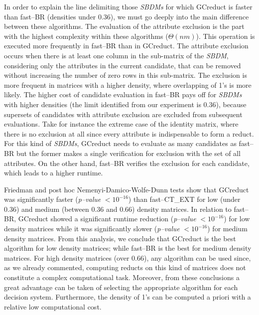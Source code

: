 \documentclass[number,preprint,review,12pt]{elsarticle}
\begin{document}
	In order to explain the line delimiting those \textit{SBDMs} for which GCreduct is faster than fast--BR (densities under 0.36), we must go deeply into the main difference between these algorithms. The evaluation of the attribute exclusion is the part with the highest complexity within these algorithms ($\Theta (nm)$). This operation is executed more frequently in fast--BR than in GCreduct. The attribute exclusion occurs when there is at least one column in the sub-matrix of the \textit{SBDM}, considering only the attributes in the current candidate, that can be removed without increasing the number of zero rows in this sub-matrix. The exclusion is more frequent in matrices with a higher density, where overlapping of 1's is more likely. The higher cost of candidate evaluation in fast--BR pays off for \textit{SBDMs} with higher densities (the limit identified from our experiment is 0.36), because supersets of candidates with attribute exclusion are excluded from subsequent evaluations. Take for instance the extreme case of the identity matrix, where there is no exclusion at all since every attribute is indispensable to form a reduct. For this kind of \textit{SBDMs}, GCreduct needs to evaluate as many candidates as fast--BR but the former makes a single verification for exclusion with the set of all attributes. On the other hand, fast--BR verifies the exclusion for each candidate, which leads to a higher runtime.
	
	Friedman and post hoc Nemenyi-Damico-Wolfe-Dunn tests show that GCreduct was significantly faster (\textit{p--value} $< 10^{-16}$) than fast--CT\_EXT for low (under 0.36) and medium (between 0.36 and 0.66) density matrices. In relation to fast--BR, GCreduct showed a significant runtime reduction (\textit{p--value} $< 10^{-16}$) for low density matrices while it was significantly slower (\textit{p--value} $< 10^{-16}$) for medium density matrices. From this analysis, we conclude that GCreduct is the best algorithm for low density matrices; while fast--BR is the best for medium density matrices. For high density matrices (over 0.66), any algorithm can be used since, as we already commented, computing reducts on this kind of matrices does not constitute a complex computational task. Moreover, from these conclusions a great advantage can be taken of selecting the appropriate algorithm for each decision system. Furthermore, the density of 1's can be computed a priori with a relative low computational cost.
		
\end{document}
